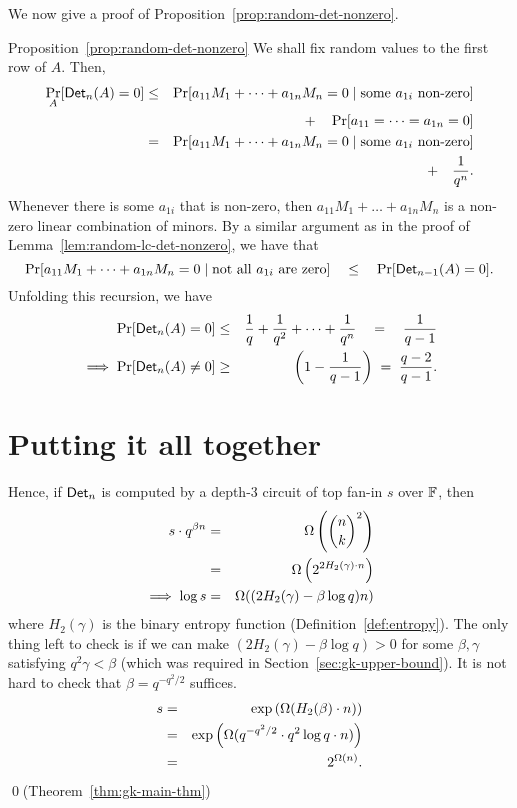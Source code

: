 We now give a proof of Proposition~\ref{prop:random-det-nonzero}. 

\begin{proofof}{Proposition~\ref{prop:random-det-nonzero}}
We shall fix random values to the first row of $A$. Then,
\begin{eqnarray*}
\Pr_{A}[\mathsf{Det}_n(A) = 0] & \leq & \Pr[a_{11} M_1 + \dots + a_{1n} M_n = 0 \;|\;\text{some $a_{1i}$ non-zero}]\\
& &\quad + \quad \Pr[a_{11}=\dots = a_{1n} = 0]\\
 & = & \Pr[a_{11} M_1 + \dots + a_{1n} M_n = 0 \;|\;\text{some $a_{1i}$ non-zero}]\\
 & & \quad + \quad \frac{1}{q^n}.
\end{eqnarray*}
Whenever there is some $a_{1i}$ that is non-zero, then $a_{11}M_1 +
\dots + a_{1n}M_n$ is a non-zero linear combination of minors. By a similar argument as in the proof of Lemma~\ref{lem:random-lc-det-nonzero}, we have that
$$
\Pr[a_{11} M_1 + \dots + a_{1n}M_n = 0\;|\;\text{not all $a_{1i}$ are zero}] \quad \leq \quad \Pr[\mathsf{Det}_{n-1}(A) = 0].
$$
Unfolding this recursion, we have
\begin{eqnarray*}
\Pr[\mathsf{Det}_n(A) = 0] & \leq & \frac{1}{q} + \frac{1}{q^2} + \dots + \frac{1}{q^n} \quad=\quad \frac{1}{q-1}\\
\implies \Pr[\mathsf{Det}_n(A) \neq 0] & \geq & \left(1 - \frac{1}{q-1}\right) \;=\; \frac{q-2}{q-1}.
\end{eqnarray*}
\end{proofof}



\section{Putting it all together}

Hence, if $\mathsf{Det}_n$ is computed by a depth-3 circuit of top fan-in $s$ over $\mathbb{F}$, then
\begin{eqnarray*}
s \cdot q^{\beta n} & = &  \Omega\left(\binom{n}{k}^2\right)\\
 & = & \Omega\left(2^{2H_2(\gamma)\cdot n}\right)\\
\implies \log s & = & \Omega((2H_2(\gamma) - \beta \log q)n)
\end{eqnarray*}
where $H_2(\gamma)$ is the binary entropy function (Definition~\ref{def:entropy}). The only thing left to check is if we can make $(2H_2(\gamma) - \beta \log q) > 0$ for some $\beta,\gamma$ satisfying $q^2 \gamma < \beta$ (which was required in Section~\ref{sec:gk-upper-bound}). It is not hard to check that $\beta = q^{-q^2/2}$ suffices. 
\begin{eqnarray*}
  s &=&  \exp\left(\Omega(H_2(\beta)\cdot n)\right) \\
    &=&  \exp\left(\Omega(q^{-q^2/2} \cdot q^2 \log q \cdot n)\right)\\
  & =& 2^{\Omega(n)}.
\end{eqnarray*}
\qed (Theorem~\ref{thm:gk-main-thm})



